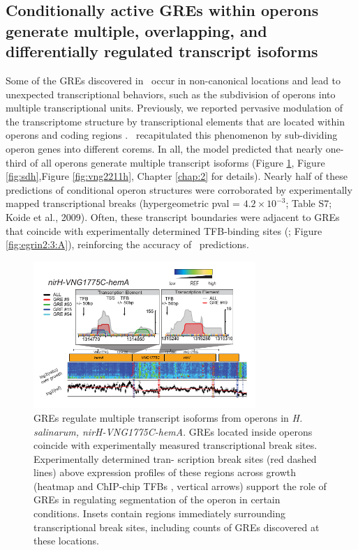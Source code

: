 \subsection{Conditionally active GREs within operons generate multiple, overlapping, and differentially regulated transcript isoforms}

Some of the GREs discovered in \egrine~occur in non-canonical locations and lead to unexpected transcriptional behaviors, such as the subdivision of operons into multiple transcriptional units.  Previously, we reported pervasive modulation of the \halo transcriptome structure by transcriptional elements that are located within operons and coding regions \cite{koide_prevalence_2009}. \egrine~recapitulated this phenomenon by sub-dividing operon genes into different corems. In all, the model predicted that nearly one-third of all \halo operons generate multiple transcript isoforms (Figure \ref{fig:nirH}, Figure \ref{fig:sdh},Figure \ref{fig:vng2211h}, Chapter \ref{chap:2} for details). Nearly half of these predictions of conditional operon structures were corroborated by experimentally mapped transcriptional breaks (hypergeometric pval = $4.2\times10^{-3}$; Table S7; Koide et al., 2009). Often, these transcript boundaries were adjacent to GREs that coincide with experimentally determined TFB-binding sites (\cite{facciotti_general_2007}; Figure \ref{fig:egrin2:3:A}), reinforcing the accuracy of \egrine~predictions.

\begin{figure}[h!]
    \centering
    \includegraphics[width=0.75\textwidth]{figures/nirH}
 	\caption[Transcriptional evidence for multiple transcript isoforms from the same operon: \textit{nirH-VNG1775C-hemA}, \halo ]{GREs regulate multiple transcript isoforms from operons in \textit{H. salinarum, nirH-VNG1775C-hemA}. GREs located inside operons coincide with experimentally measured transcriptional break sites. Experimentally determined tran- scription break sites (red dashed lines) above expression profiles of these regions across growth (heatmap \cite{koide_prevalence_2009} and ChIP-chip TFBs \cite{facciotti_general_2007}, vertical arrows) support the role of GREs in regulating segmentation of the operon in certain conditions. Insets contain regions immediately surrounding transcriptional break sites, including counts of GREs discovered at these locations.
}
    \label{fig:nirH}
\end{figure}

